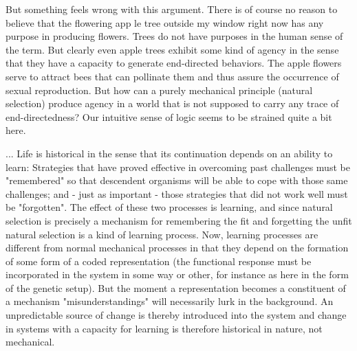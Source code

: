 \documentclass{ut-thesis}
\begin{document}
\begin{longquote}
But something feels wrong with this argument. There is of course no reason 
to believe that the flowering app le tree outside my window right now has any purpose 
in producing flowers. Trees do not have purposes in the human sense of the term. But 
clearly even apple trees exhibit some kind of agency in the sense that they have a 
capacity to generate end-directed behaviors. The apple flowers serve to attract bees 
that can pollinate them and thus assure the occurrence of sexual reproduction. But 
how can a purely mechanical principle (natural selection) produce agency in a world 
that is not supposed to carry any trace of end-directedness? Our intuitive sense of 
logic seems to be strained quite a bit here.

...
Life is historical in the sense that its continuation depends on an ability to learn: Strategies 
that have proved effective in overcoming past challenges must be "remembered" so 
that descendent organisms will be able to cope with those same challenges; and 
- just as important -
 those strategies that did not work well must be "forgotten". The effect of these two processes is 
learning, and since natural selection is precisely a mechanism for remembering the fit and forgetting the unfit natural selection is a kind 
of learning process. Now, learning processes are different from normal mechanical 
processes in that they depend on the formation of some form of a coded 
representation (the functional response must be incorporated in the system in some 
way or other, for instance as here in the form of the genetic setup). But the moment a 
representation becomes a constituent of a mechanism "misunderstandings" will 
necessarily lurk in the background. An unpredictable source of change is thereby 
introduced into the system and change in systems with a capacity for learning is 
therefore historical in nature, not mechanical.


\end{longquote}
\end{document}

